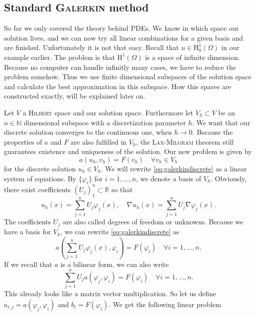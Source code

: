 \documentclass[12pt,a4paper,twoside, open=right]{scrreprt}
\theoremstyle{definition}
\theoremstyle{plain}
\newcommand{\rr}{\mathbb{R}}
\newcommand{\nn}{\mathbb{N}}
\begin{document}
\subsection{Standard \textsc{Galerkin} method}
So far we only covered the theory behind PDEs. We know in which space our solution lives, and we can now try all linear combinations for a given basis and are finished. Unfortunately it is not that easy. Recall that $u\in \mathrm{H}^1_0(\Omega)$ in our example earlier. The problem is that $\mathrm{H}^1(\Omega)$ is a space of infinite dimension. Because no computer can handle infinitly many cases, we have to reduce the problem somehow. Thus we use finite dimensional subspaces of the solution space and calculate the best approximation in this subspace. How this spaces are constructed exactly, will be explained later on. 
\par 
Let $V$ a \textsc{Hilbert} space and our solution space. Furthermore let $V_h\subset V$ be an $n\in\nn$ dimensional subspace with a discretization parameter $h$. We want that our discrete solution converges to the continuous one, when $h\to 0$. Because the properties of $a$ and $F$ are also fulfilled in $V_h$, the \textsc{Lax-Milgram} theorem still guarantees existence and uniqueness of the solution. Our new problem is given by
\begin{equation}
    a(u_h,v_h) = F(v_h) \quad \forall v_h\in V_h \label{eq:galerkindiscrete}
\end{equation}
for the discrete solution $u_h\in V_h$.
We will rewrite \eqref{eq:galerkindiscrete} as a linear system of equations. By $\{\varphi_i\}$ for $i=1,\dotsc,n$, we denote a basis of $V_h$. Obviously, there exist coefficients $(U_j)_1^n\subset\rr$ so that
\begin{equation}
    u_h(x)=\sum_{j=1}^{n}U_j\varphi_j(x),\quad \nabla u_h(x)=\sum_{j=1}^{n}U_j\nabla\varphi_j(x).
\end{equation}
The coefficients $U_j$ are also called degrees of freedom or unknowns. Because we have a basis for $V_h$, we can rewrite \eqref{eq:galerkindiscrete} as 
\begin{equation}
    a\left(\sum_{j=1}^{n}U_j\varphi_j(x),\varphi_i\right)= F(\varphi_i)\quad \forall i=1,\dotsc,n.
\end{equation}
If we recall that $a$ is a bilinear form, we can also write
\begin{equation}
    \sum_{j=1}^{n}U_ja(\varphi_j,\varphi_i)=F(\varphi_i) \quad\forall i=1,\dotsc,n.
\end{equation}
This already looks like a matrix vector multiplication. So let us define $a_{i,j}=a(\varphi_j,\varphi_i)$ and $b_i=F(\varphi_i)$. We get the following linear problem
\end{document}
